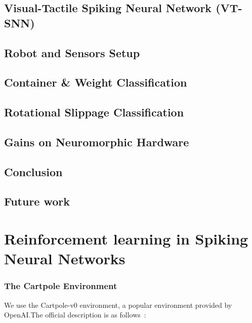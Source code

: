 \documentclass[fyp]{socreport}
\begin{document}
\section{Visual-Tactile Spiking Neural Network (VT-SNN)\label{sec:snnrl_vtsnn}}

\section{Robot and Sensors Setup\label{sec:snnrl_exp_setup}}

\section{Container \& Weight Classification\label{sec:snnrl_container_class}}

\section{Rotational Slippage Classification\label{sec:snnrl_slippage}}

\section{Gains on Neuromorphic Hardware\label{sec:snnrl_neuromorphic}}

\section{Conclusion\label{sec:snnrl_conclusion}}

\section{Future work\label{sec:snnrl_future_work}}

\chapter{Reinforcement learning in Spiking Neural Networks\label{cha:snnrl}}


\subsection{The Cartpole Environment}


We use the Cartpole-v0 environment, a popular environment provided by
OpenAI.\@ The official description is as follows~\cite{openai_gym}:
\end{document}
